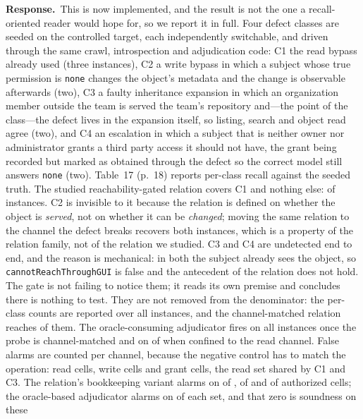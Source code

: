 \documentclass[10pt,letterpaper]{article}
\newcommand{\Response}[1]{\par\smallskip\noindent\textbf{Response.}\ #1\par}
\begin{document}
\Response{This is now implemented, and the result is not the one a recall-oriented
reader would hope for, so we report it in full. Four defect classes are seeded on
the controlled target, each independently switchable, and driven through the same
crawl, introspection and adjudication code: C1 the read bypass already used
(three instances), C2 a write bypass in which a subject whose true permission is
\texttt{none} changes the object's metadata and the change is observable
afterwards (two), C3 a faulty inheritance expansion in which an organization
member outside the team is served the team's repository and---the point of the
class---the defect lives in the expansion itself, so listing, search and object
read agree (two), and C4 an escalation in which a subject that is neither owner
nor administrator grants a third party access it should not have, the grant being
recorded but marked as obtained through the defect so the correct model still
answers \texttt{none} (two). Table~17 (p.~18) reports per-class recall against the
seeded truth. The studied reachability-gated relation covers C1 and nothing else:
\McReadHits{} of \McInstances{} instances. C2 is invisible to it because the relation is defined on
whether the object is \emph{served}, not on whether it can be \emph{changed};
moving the same relation to the channel the defect breaks recovers both
instances, which is a property of the relation family, not of the relation we
studied. C3 and C4 are undetected end to end, and the reason is mechanical: in
both the subject already sees the object, so \texttt{cannotReachThroughGUI} is
false and the antecedent of the relation does not hold. The gate is not failing to
notice them; it reads its own premise and concludes there is nothing to test.
They are not removed from the denominator: the per-class counts are reported over
all \McInstances{} instances, and the channel-matched relation reaches
\McChannelHits{} of them. The oracle-consuming adjudicator fires on all
\McInstances{} instances once the probe is channel-matched and on
\McOracleReadHits{} of \McInstances{} when confined to the read channel. False
alarms are counted per channel, because the negative control has to match the
operation: \McNegRead{} read cells, \McNegWrite{} write cells and \McNegGrant{}
grant cells, the read set shared by C1 and C3. The relation's bookkeeping variant
alarms on \McFpRelRead{} of \McNegRead{}, \McFpRelWrite{} of \McNegWrite{} and
\McFpRelGrant{} of \McNegGrant{} authorized cells; the oracle-based adjudicator
alarms on \McFpOracleMax{} of each set, and that zero is soundness on these
}
\end{document}

